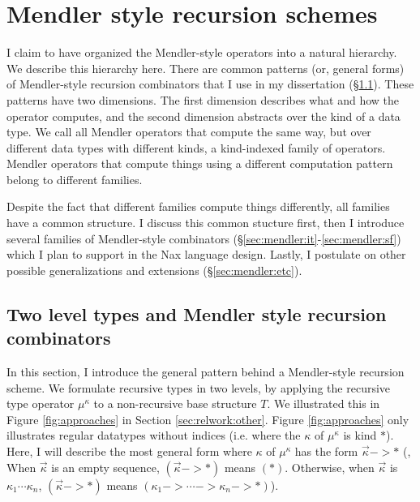 \section{Mendler style recursion schemes}\label{sec:mendler} I claim to
have organized the Mendler-style operators into a natural hierarchy. We
describe this hierarchy here. There are common patterns (or, general
forms) of Mendler-style recursion combinators that I use in my
dissertation (\S\ref{sec:mendler:intro}). These patterns have two
dimensions. The first dimension describes what and how the operator
computes, and the second dimension abstracts over the kind of a data
type. We call all Mendler operators that compute the same way, but over
different data types with different kinds,  a kind-indexed family of
operators. Mendler operators that compute things using a different
computation pattern belong to different families.

Despite the fact that different families compute things differently, all
families have a common structure. I discuss this common stucture first,
then I introduce several families of Mendler-style combinators
(\S\ref{sec:mendler:it}-\ref{sec:mendler:sf}) which I plan to support in
the Nax language design. Lastly, I postulate on other possible
generalizations and extensions (\S\ref{sec:mendler:etc}).

\subsection{Two level types and Mendler style recursion combinators}
\label{sec:mendler:intro}
In this section, I introduce the general pattern behind a Mendler-style recursion scheme.
We formulate recursive types in two levels,  by applying the recursive type operator
$\mu^\kappa$ to a non-recursive base structure $T$. 
We illustrated this in Figure \ref{fig:approaches}
in Section \ref{sec:relwork:other}. Figure \ref{fig:approaches}
only illustrates regular datatypes without indices
(i.e. where the $\kappa$ of $\mu^\kappa$ is kind $*$). Here, I will describe
the most general form where $\kappa$ of $\mu^\kappa$ has the form
$\vec{\kappa} -> *$ (\ie, When $\vec{\kappa}$ is an empty sequence,
$(\vec{\kappa} -> *)$ means $(*)$. Otherwise, when $\vec{\kappa}$ is
$\kappa_1 \cdots \kappa_n$, $(\vec{\kappa} -> *)$ means
$(\kappa_1 -> \cdots -> \kappa_n -> *)$).


